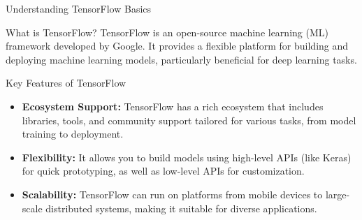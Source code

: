 \documentclass[aspectratio=169]{beamer}
\begin{document}
\begin{frame}{Understanding TensorFlow Basics}
    \begin{block}{What is TensorFlow?}
        TensorFlow is an open-source machine learning (ML) framework developed by Google. 
        It provides a flexible platform for building and deploying machine learning models, particularly beneficial for deep learning tasks.
    \end{block}
\end{frame}

\begin{frame}{Key Features of TensorFlow}
    \begin{itemize}
        \item \textbf{Ecosystem Support:} 
        TensorFlow has a rich ecosystem that includes libraries, tools, and community support tailored for various tasks, from model training to deployment.
        
        \item \textbf{Flexibility:} 
        It allows you to build models using high-level APIs (like Keras) for quick prototyping, as well as low-level APIs for customization.
        
        \item \textbf{Scalability:} 
        TensorFlow can run on platforms from mobile devices to large-scale distributed systems, making it suitable for diverse applications.
    \end{itemize}
\end{frame}
\end{document}
